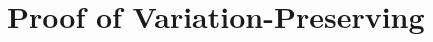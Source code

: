 \documentclass[onehalf,11pt]{beavtex}
\begin{document}
%
%
%





\appendix
\chapter{Proof of Variation-Preserving}
\label{sec:proof}
\end{document}
